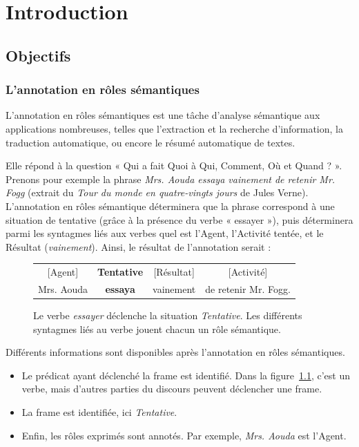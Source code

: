 \chapter{Introduction}
\label{ch:intro}

\section{Objectifs}

\subsection{L'annotation en rôles sémantiques}

L'annotation en rôles sémantiques est une tâche d'analyse sémantique aux
applications nombreuses, telles que l'extraction et la recherche d'information,
la traduction automatique, ou encore le résumé automatique de textes.

Elle répond à la question « Qui a fait Quoi à Qui, Comment, Où et Quand ? ».
Prenons pour exemple la phrase \emph{Mrs. Aouda essaya vainement de retenir Mr.
Fogg} (extrait du \emph{Tour du monde en quatre-vingts jours} de Jules Verne).
L'annotation en rôles sémantique déterminera que la phrase correspond à une
situation de tentative (grâce à la présence du verbe « essayer »), puis
déterminera parmi les syntagmes liés aux verbes quel est l'Agent, l'Activité
tentée, et le Résultat (\emph{vainement}). Ainsi, le résultat de l'annotation
serait :

\begin{figure}[ht]
    \centering
    \begin{tabular}{cccc}
    [Agent]  & \textbf{Tentative} & [Résultat]  & [Activité]         \tabularnewline
    Mrs. Aouda & \textbf{essaya}  & vainement & de retenir Mr. Fogg. \tabularnewline
    \end{tabular}
    \caption{\label{fig:introsrl}Le verbe \emph{essayer} déclenche la situation \emph{Tentative}.
    Les différents syntagmes liés au verbe jouent chacun un rôle sémantique.}
\end{figure}


Différents informations sont disponibles après l'annotation en rôles sémantiques.

\begin{itemize}
    \item Le prédicat ayant déclenché la frame est identifié. Dans la
        figure~\ref{fig:introsrl}, c'est un verbe, mais d'autres parties du
        discours peuvent déclencher une frame.
    \item La frame est identifiée, ici \emph{Tentative}.
    \item Enfin, les rôles exprimés sont annotés. Par exemple, \emph{Mrs.
        Aouda} est l'Agent.
\end{itemize}

